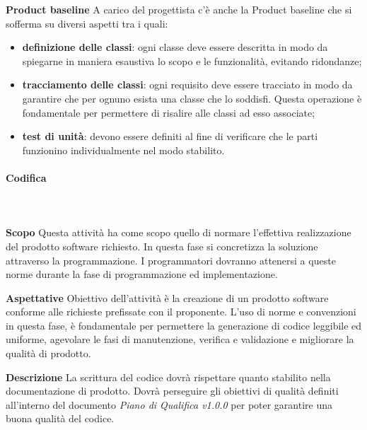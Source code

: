 \textbf{Product baseline} \newline \newline
A carico del progettista c'è anche la Product baseline che si sofferma su 
diversi aspetti tra i quali:
	\begin{itemize}
		\item \textbf{definizione delle classi}: ogni classe deve essere descritta 
			in modo da spiegarne in maniera esaustiva lo scopo e le funzionalità, evitando 
			ridondanze;
		\item \textbf{tracciamento delle classi}: ogni requisito deve essere 
			tracciato in modo da garantire che per ognuno esista una classe che lo soddisfi. 
			Questa operazione è fondamentale per permettere di risalire alle classi ad esso 
			associate;
		\item \textbf{test di unità}: devono essere definiti al fine di verificare 
			che le parti funzionino individualmente nel modo stabilito.
	\end{itemize}
		
\paragraph{Codifica} \mbox{}\\ \mbox{}\\
\textbf{Scopo} \newline \newline
Questa attività ha come scopo quello di normare l'effettiva realizzazione del 
prodotto software richiesto. In questa fase si concretizza la soluzione 
attraverso la programmazione. I programmatori dovranno attenersi a queste norme 
durante la fase di programmazione ed implementazione. \newline \newline
			
\textbf{Aspettative} \newline \newline
Obiettivo dell'attività è la creazione di un prodotto software conforme alle 
richieste prefissate con il proponente.
L'uso di norme e convenzioni in questa fase, è fondamentale per permettere la 
generazione di codice leggibile ed uniforme,  agevolare le fasi di manutenzione, 
verifica e validazione e migliorare la qualità di prodotto. \newline \newline

\textbf{Descrizione} \newline \newline
La scrittura del codice dovrà rispettare quanto stabilito nella 
documentazione di prodotto. Dovrà perseguire gli obiettivi di qualità definiti 
all'interno del documento \textit{Piano di Qualifica v1.0.0} per poter garantire 
una buona qualità del codice. \newline \newline

